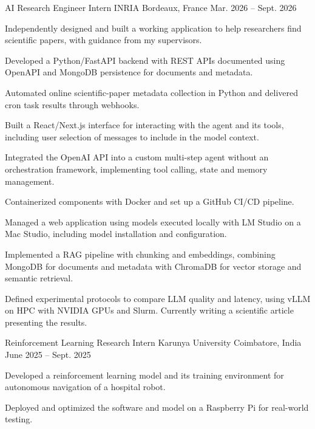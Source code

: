 
\begin{cventries}
  \cventry
    {AI Research Engineer Intern}
    {INRIA}
    {Bordeaux, France}
    {Mar. 2026 -- Sept. 2026}
    {
      \begin{cvitems}
        \item {Independently designed and built a working application to help researchers find scientific papers, with guidance from my supervisors.}
        \item {Developed a Python/FastAPI backend with REST APIs documented using OpenAPI and MongoDB persistence for documents and metadata.}
        \item {Automated online scientific-paper metadata collection in Python and delivered cron task results through webhooks.}
        \item {Built a React/Next.js interface for interacting with the agent and its tools, including user selection of messages to include in the model context.}
        \item {Integrated the OpenAI API into a custom multi-step agent without an orchestration framework, implementing tool calling, state and memory management.}
        \item {Containerized components with Docker and set up a GitHub CI/CD pipeline.}
        \item {Managed a web application using models executed locally with LM Studio on a Mac Studio, including model installation and configuration.}
        \item {Implemented a RAG pipeline with chunking and embeddings, combining MongoDB for documents and metadata with ChromaDB for vector storage and semantic retrieval.}
        \item {Defined experimental protocols to compare LLM quality and latency, using vLLM on HPC with NVIDIA GPUs and Slurm. Currently writing a scientific article presenting the results.}
      \end{cvitems}
    }

  \cventry
    {Reinforcement Learning Research Intern}
    {Karunya University}
    {Coimbatore, India}
    {June 2025 -- Sept. 2025}
    {
      \begin{cvitems}
        \item {Developed a reinforcement learning model and its training environment for autonomous navigation of a hospital robot.}
        \item {Deployed and optimized the software and model on a Raspberry Pi for real-world testing.}
      \end{cvitems}
    }
\end{cventries}
